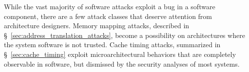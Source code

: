 While the vast majority of software attacks exploit a bug in a software
component, there are a few attack classes that deserve attention from
architecture designers. Memory mapping attacks, described in
\S~\ref{sec:address_translation_attacks}, become a possibility on architectures
where the system software is not trusted. Cache timing attacks, summarized in
\S~\ref{sec:cache_timing} exploit microarchitectural behaviors that are
completely observable in software, but dismissed by the security analyses of
most systems.









